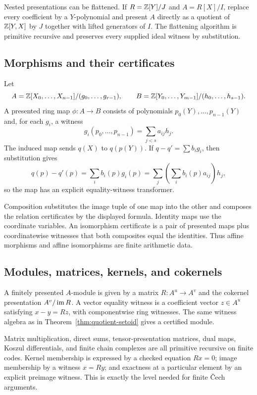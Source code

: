 Nested presentations can be flattened.  If
$R=\mathbb Z[Y]/J$ and $A=R[X]/I$, replace every coefficient by a $Y$-polynomial and present $A$ directly
as a quotient of $\mathbb Z[Y,X]$ by $J$ together with lifted generators of $I$.  The flattening algorithm
is primitive recursive and preserves every supplied ideal witness by substitution.

\subsection{Morphisms and their certificates}

Let
\[
 A=\mathbb Z[X_0,\ldots,X_{n-1}]/(g_0,\ldots,g_{r-1}),\qquad
 B=\mathbb Z[Y_0,\ldots,Y_{m-1}]/(h_0,\ldots,h_{s-1}).
\]
A presented ring map $\phi:A\to B$ consists of polynomials
$p_0(Y),\ldots,p_{n-1}(Y)$ and, for each $g_i$, a witness
\[
  g_i(p_0,\ldots,p_{n-1})=\sum_{j<s} a_{ij}h_j.
\]
The induced map sends $q(X)$ to $q(p(Y))$.  If $q-q'=\sum b_i g_i$, then substitution gives
\[
 q(p)-q'(p)=\sum_i b_i(p)g_i(p)
           =\sum_j\left(\sum_i b_i(p)a_{ij}\right)h_j,
\]
so the map has an explicit equality-witness transformer.

Composition substitutes the image tuple of one map into the other and composes the relation
certificates by the displayed formula.  Identity maps use the coordinate variables.  An isomorphism
certificate is a pair of presented maps plus coordinatewise witnesses that both composites equal the
identities.  Thus affine morphisms and affine isomorphisms are finite arithmetic data.

\subsection{Modules, matrices, kernels, and cokernels}

A finitely presented $A$-module is given by a matrix
$R:A^u\to A^v$ and the cokernel presentation $A^v/\operatorname{im} R$.  A vector equality witness is a coefficient
vector $z\in A^u$ satisfying $x-y=Rz$, with componentwise ring witnesses.  The same witness algebra
as in Theorem~\ref{thm:quotient-setoid} gives a certified module.

Matrix multiplication, direct sums, tensor-presentation matrices, dual maps, Koszul differentials,
and finite chain complexes are all primitive recursive on finite codes.  Kernel membership is
expressed by a checked equation $Rx=0$; image membership by a witness $x=Ry$; and exactness at a
particular element by an explicit preimage witness.  This is exactly the level needed for finite
\v{C}ech arguments.

